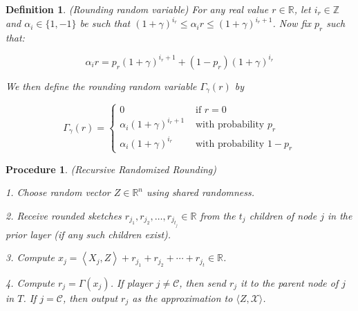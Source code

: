 \documentclass{article}
\theoremstyle{plain}
\newtheorem{defn}[theorem]{Definition}
\newtheorem{procedure}[theorem]{Procedure}
\begin{document}
\begin{defn}\cite{rounding}(Rounding random variable)  \label{rounding variable}
    For any real value $r \in \mathbb{R}$, let $i_r \in \mathbb{Z}$ and $\alpha_i \in\{1,-1\}$ be such that $(1+\gamma)^{i_r} \leq \alpha_i r \leq(1+\gamma)^{i_r+1}$. Now fix $p_r$ such that:

$$
\alpha_i r=p_r(1+\gamma)^{i_r+1}+\left(1-p_r\right)(1+\gamma)^{i_r}
$$


We then define the rounding random variable $\Gamma_{\gamma}(r)$ by

$$
\Gamma_{\gamma}(r)= \begin{cases}0 & \text { if } r=0 \\ \alpha_i(1+\gamma)^{i_r+1} & \text { with probability } p_r \\ \alpha_i(1+\gamma)^{i_r} & \text { with probability } 1-p_r\end{cases}
$$
    
\end{defn}

\begin{procedure}(Recursive Randomized Rounding) \label{distributed rounding procedure}

1. Choose random vector $Z \in \mathbb{R}^n$ using shared randomness.

2. Receive rounded sketches $r_{j_1}, r_{j_2}, \ldots, r_{j_{t_j}} \in \mathbb{R}$ from the $t_j$ children of node $j$ in the prior layer (if any such children exist).

3. Compute $x_j=\left\langle X_j, Z\right\rangle+r_{j_1}+r_{j_2}+\cdots+r_{j_t} \in \mathbb{R}$.

4. Compute $r_j=\Gamma\left(x_j\right)$. If player $j \neq \mathcal{C}$, then send $r_j$ it to the parent node of $j$ in $T$. If $j=\mathcal{C}$, then output $r_j$ as the approximation to $\langle Z, \mathcal{X}\rangle$.
\end{procedure}
\end{document}
